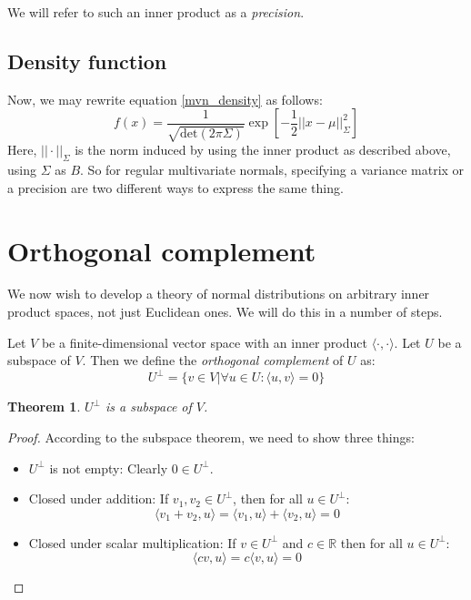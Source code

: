 \documentclass[12pt, a4paper]{article}
\newtheorem{theorem}{Theorem}[section]
\numberwithin{equation}{section}
\begin{document}
We will refer to such an inner product as a \textit{precision}.

\subsection{Density function}
Now, we may rewrite equation \ref{mvn_density} as follows:
\begin{equation}
f(x)=\frac{1}{\sqrt{\textrm{det}(2\pi\Sigma)}}\exp\left[-\frac{1}{2}||x-\mu||_\Sigma^2\right]
\end{equation}
Here, $||\cdot||_\Sigma$ is the norm induced by using the inner product as described above, using $\Sigma$ as $B$. So for regular multivariate normals, specifying a variance matrix or a precision are two different ways to express the same thing.

\section{Orthogonal complement}
We now wish to develop a theory of normal distributions on arbitrary inner product spaces, not just Euclidean ones. We will do this in a number of steps.

Let $V$ be a finite-dimensional vector space with an inner product $\langle\cdot,\cdot\rangle$. Let $U$ be a subspace of $V$. Then we define the \textit{orthogonal complement} of $U$ as:
\begin{equation}
U^\perp=\{v\in V|\forall u\in U: \langle u, v\rangle = 0\}
\end{equation}
\begin{theorem}
$U^\perp$ is a subspace of $V$.
\end{theorem}
\begin{proof}
According to the subspace theorem, we need to show three things:
\begin{itemize}
\item $U^\perp$ is not empty: Clearly $0\in U^\perp$.
\item Closed under addition: If $v_1,v_2\in U^\perp$, then for all $u\in U^\perp$:
\begin{equation}
\langle v_1+v_2,u\rangle=\langle v_1,u\rangle + \langle v_2,u\rangle = 0 
\end{equation}
\item Closed under scalar multiplication: If $v\in U^\perp$ and $c\in\mathbb{R}$ then for all $u\in U^\perp$:
\begin{equation}
\langle cv,u\rangle = c\langle v,u\rangle = 0
\end{equation}
\end{itemize}
\end{proof}
\end{document}
